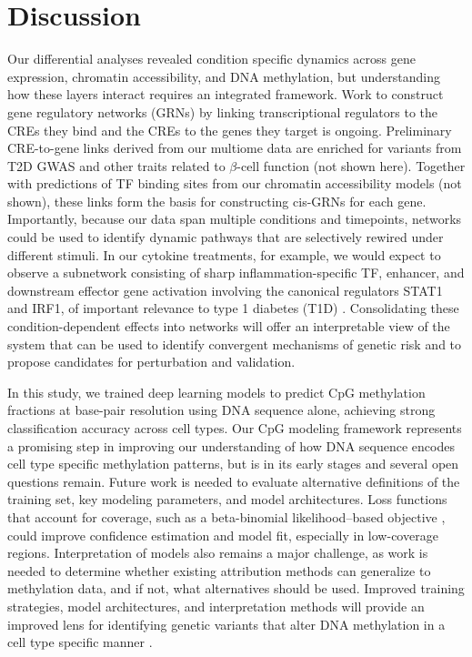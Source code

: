 \clearpage

\section{Discussion}

Our differential analyses revealed condition specific dynamics across gene expression, chromatin accessibility, and DNA methylation, but understanding how these layers interact requires an integrated framework. Work to construct gene regulatory networks (GRNs) by linking transcriptional regulators to the CREs they bind and the CREs to the genes they target \cite{Levine2005-je,Badia-I-Mompel2023-fu} is ongoing. Preliminary CRE-to-gene links derived from our multiome data are enriched for variants from T2D GWAS and other traits related to $\beta$-cell function (not shown here). Together with predictions of TF binding sites from our chromatin accessibility models (not shown), these links form the basis for constructing cis-GRNs for each gene. Importantly, because our data span multiple conditions and timepoints, networks could be used to identify dynamic pathways that are selectively rewired under different stimuli. In our cytokine treatments, for example, we would expect to observe a subnetwork consisting of sharp inflammation-specific TF, enhancer, and downstream effector gene activation involving the canonical regulators STAT1 and IRF1, of important relevance to type 1 diabetes (T1D) \cite{Benaglio2022-rq}. Consolidating these condition-dependent effects into networks will offer an interpretable view of the system that can be used to identify convergent mechanisms of genetic risk \cite{Schnitzler2024-xi} and to propose candidates for perturbation and validation.

In this study, we trained deep learning models to predict CpG methylation fractions at base-pair resolution using DNA sequence alone, achieving strong classification accuracy across cell types. Our CpG modeling framework represents a promising step in improving our understanding of how DNA sequence encodes cell type specific methylation patterns, but is in its early stages and several open questions remain. Future work is needed to evaluate alternative definitions of the training set, key modeling parameters, and model architectures. Loss functions that account for coverage, such as a beta-binomial likelihood–based objective \cite{Dolzhenko2014-mw}, could improve confidence estimation and model fit, especially in low-coverage regions. Interpretation of models also remains a major challenge, as work is needed to determine whether existing attribution methods can generalize to methylation data, and if not, what alternatives should be used. Improved training strategies, model architectures, and interpretation methods will provide an improved lens for identifying genetic variants that alter DNA methylation in a cell type specific manner \cite{Zeng2017-kb}.

